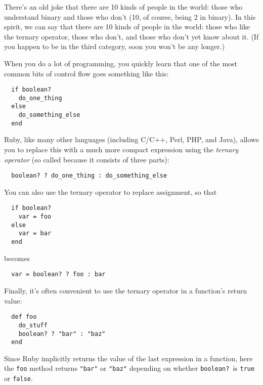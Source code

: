 \begin{aside}
\label{aside:ternary_operator}

There's an old joke that there are 10 kinds of people in the world: those who understand binary and those who don't (10, of course, being 2 in binary). In this spirit, we can say that there are 10 kinds of people in the world: those who like the ternary operator, those who don't, and those who don't yet know about it. (If you happen to be in the third category, soon you won't be any longer.)

When you do a lot of programming, you quickly learn that one of the most common bits of control flow goes something like this:

\begin{verbatim}
  if boolean?
    do_one_thing
  else
    do_something_else
  end
\end{verbatim}

\noindent Ruby, like many other languages (including C/C++, Perl, PHP, and Java), allows you to replace this with a much more compact expression using the \emph{ternary operator} (so called because it consists of three parts):

\begin{verbatim}
  boolean? ? do_one_thing : do_something_else
\end{verbatim}

\noindent You can also use the ternary operator to replace assignment, so that

\begin{verbatim}
  if boolean?
    var = foo
  else
    var = bar
  end
\end{verbatim}

\noindent becomes

\begin{verbatim}
  var = boolean? ? foo : bar
\end{verbatim}

\noindent Finally, it's often convenient to use the ternary operator in a function's return value:

\begin{verbatim}
  def foo
    do_stuff
    boolean? ? "bar" : "baz"
  end
\end{verbatim}

\noindent Since Ruby implicitly returns the value of the last expression in a function, here the \texttt{foo} method returns \texttt{"bar"} or \texttt{"baz"} depending on whether \texttt{boolean?}\ is \texttt{true} or \texttt{false}.

\end{aside}

